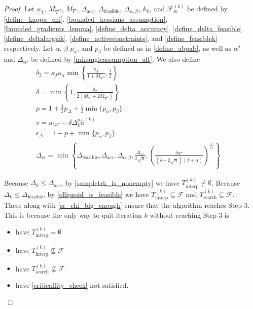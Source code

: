 \documentclass{article}
\theoremstyle{case}
\numberwithin{theorem}{subsection}
\newcommand{\activeconstraintsk}{{\mathbb A_{k}}}
\newcommand{\dacc}{{\Delta_{\textrm{acc}}}}
\newcommand{\deltalargzik}{{\Delta_{\alpha,\beta}}}
\newcommand{\dfeas}{{\Delta_{\textrm{feasible}}}}
\newcommand{\dk}{\Delta_k}
\newcommand{\dsr}{{\Delta_{\textrm{sr}}}}
\newcommand{\feasiblek}{{\mathcal F_m^{(k)}}}
\newcommand{\feasible}{{\mathcal F}}
\newcommand{\huk}{{{\hat u}^{(k)}}}
\newcommand{\maxgrad}{{M_{\nabla}}}
\newcommand{\maxhessian}{{M_{\nabla^2}}}
\newcommand{\minanglealpha}{{ \alpha^{\star} }}
\newcommand{\minangledelta}{{\Delta_{\alpha^{\star}}}}
\newcommand{\sampletrk}{{T_{\text{interp}}^{(k)}}}
\newcommand{\searchtrk}{{T_{\text{search}}^{(k)}}}
\begin{document}
\begin{proof}

Let
$\kappa_{\chi}$,
$\maxhessian$,
$\maxgrad$,
$\dacc$,
$\dfeas$,
$\deltalargzik$,
$\activeconstraintsk$,
and $\feasiblek$
be defined by
\cref{define_kappa_chi},
\cref{bounded_hessians_assumption},
\cref{bounded_gradients_lemma},
\cref{define_delta_accuracy},
\cref{define_delta_feasible},
\cref{define_deltalargzik},
\cref{define_activeconstraints},
and \cref{define_feasiblek}
respectively.
Let $\alpha$, $\beta$ $p_{\alpha}$, and $p_{\beta}$
be defined as in \cref{define_abpab}, as well as $\minanglealpha$ and $\minangledelta$ be defined by \cref{minangleassumption_alt}.
We also define
\begin{align}
\delta_2 = \kappa_f \kappa_{\chi} \min\left\{ \frac{\kappa_{\chi}}{1 + \maxhessian}, \frac 1 2 \right\} \label{define_delta2} \\
\delta = \min\left\{1, \frac{\delta_2}{2\left(\maxgrad + 2\maxhessian\right)}\right\} \label{sr_define_delta} \\
p = 1 + \frac 1 2 p_{\Delta} + \frac 1 2\min\{p_{\alpha}, p_{\beta}\} \label{sr_def_p}\\
v = u_{GC} - \delta \dk^{p} \huk \label{define_v} \\
\epsilon_{\Delta} = 1-p+\min\{p_{\alpha}, p_{\beta}\}. \label{sr_def_epsilon_delta} \\
\dsr = \min\left\{
\dfeas,
\dacc,
\deltalargzik,
\frac{\minangledelta}{3\sqrt{n}},
\left(\frac{\delta \minanglealpha}{\left(\delta + 2\sqrt{n}\right)\left(\beta +\alpha\right)}\right)^{\frac 1 {\epsilon_{\Delta}}}
\right\} \label{define_delta_sufficient_reduction}
\end{align}

\color{red}
Because $\dk \le \dacc$, by \cref{sampletrk_is_nonempty} we have $\sampletrk \ne \emptyset$.
Because $\dk \le \dfeas$, by \cref{ellipsoid_is_feasible} we have $\sampletrk \subseteq \feasible$ and $\searchtrk \subseteq \feasible$.
These along with \cref{sr_chi_big_enough} ensure that the algorithm reaches Step 3.
This is because the only way to quit iteration $k$ without reaching Step 3 is
\begin{itemize}
\item have $\sampletrk = \emptyset$
\item have $\sampletrk \not \subseteq \feasible$
\item have $\searchtrk \not \subseteq \feasible$
\item have \cref{criticallity_check} not satisfied.
\end{itemize}
\color{black}


\end{proof}
\end{document}
